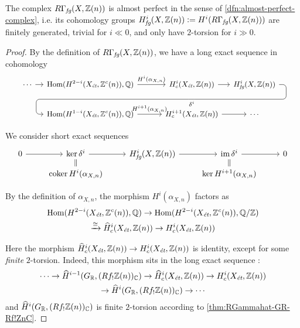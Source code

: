\begin{proposition}
  \label{prop:RGammafg-almost-perfect}
  The complex $R\Gamma_\text{\it fg} (X, \mathbb{Z} (n))$ is almost perfect in the
  sense of \ref{dfn:almost-perfect-complex}, i.e. its cohomology groups
  $H^i_\text{\it fg} (X, \mathbb{Z} (n)) \mathrel{\mathop:}= H^i (R\Gamma_\text{\it fg} (X, \mathbb{Z} (n)))$
  are finitely generated, trivial for $i \ll 0$, and only have $2$-torsion for
  $i \gg 0$.

  \begin{proof}
    By the definition of $R\Gamma_\text{\it fg} (X, \mathbb{Z} (n))$, we have a long
    exact sequence in cohomology
    \[ \begin{tikzcd}[column sep=1em,font=\small]
        \cdots\ar{r} & \Hom (H^{2-i} (X_\text{\it ét}, \ZZ^c (n)), \QQ) \ar{r}{H^i (\alpha_{X,n})} &[2em] H^i_c (X_\text{\it ét}, \ZZ (n))\ar{r}\ar[draw=none]{d}[name=X, anchor=center]{} & H^i_\text{\it fg} (X, \ZZ (n)) \ar[rounded corners,to path={ -- ([xshift=2ex]\tikztostart.east) |- (X.center) \tikztonodes -| ([xshift=-2ex]\tikztotarget.west) -- (\tikztotarget)}]{dll}[at end]{\delta^i} \\
        & \Hom (H^{1-i} (X_\text{\it ét}, \ZZ^c (n)), \QQ)\ar{r}{H^{i+1} (\alpha_{X,n})} & H^{i+1}_c (X_\text{\it ét}, \ZZ (n))\ar{r} & \cdots
      \end{tikzcd} \]

    We consider short exact sequences
    \[ \begin{tikzcd}[row sep=0.5em]
        0 \ar{r} & \ker \delta^i \ar{r}\ar[equals]{d} & H^i_\text{\it fg} (X, \ZZ (n)) \ar{r} & \im \delta^i \ar{r}\ar[equals]{d} & 0\\
        & \coker H^i (\alpha_{X,n}) & & \ker H^{i+1} (\alpha_{X,n})
      \end{tikzcd} \]

    By the definition of $\alpha_{X,n}$, the morphism $H^i (\alpha_{X,n})$
    factors as
    \begin{multline*}
      \operatorname{Hom} (H^{2-i} (X_\text{\it ét}, \mathbb{Z}^c (n)), \mathbb{Q}) \to
      \operatorname{Hom} (H^{2-i} (X_\text{\it ét}, \mathbb{Z}^c (n)), \mathbb{Q}/\mathbb{Z}) \\
      \xrightarrow{\cong} \widehat{H}^i_c (X_\text{\it ét}, \mathbb{Z} (n)) \to
      H^i_c (X_\text{\it ét}, \mathbb{Z} (n))
    \end{multline*}

    Here the morphism
    $\widehat{H}^i_c (X_\text{\it ét}, \mathbb{Z} (n)) \to H^i_c (X_\text{\it ét}, \mathbb{Z} (n))$
    is identity, except for some \emph{finite} $2$-torsion. Indeed, this
    morphism sits in the long exact sequence :
    \begin{multline*}
      \cdots \to \widehat{H}^{i-1} (G_{\mathbb{R}}, (Rf_! \mathbb{Z} (n))_{\mathbb{C}}) \to
      \widehat{H}^i_c (X_\text{\it ét}, \mathbb{Z} (n)) \to
      H^i_c (X_\text{\it ét}, \mathbb{Z} (n)) \\
      \to \widehat{H}^i (G_{\mathbb{R}}, (Rf_! \mathbb{Z} (n))_{\mathbb{C}}) \to \cdots
    \end{multline*}
    and $\widehat{H}^i (G_{\mathbb{R}}, (Rf_! \mathbb{Z} (n))_{\mathbb{C}})$ is finite $2$-torsion
    according to \ref{thm:RGammahat-GR-Rf!ZnC}.


\end{proof}
\end{proposition}
